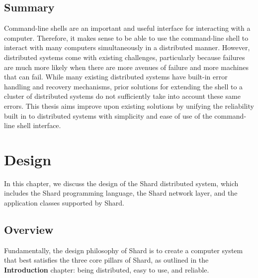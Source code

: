 \documentclass[twoside]{report}
\begin{document}
\section{Summary}
Command-line shells are an important and useful interface for interacting with a computer.
Therefore, it makes sense to be able to use the command-line shell to interact with many computers simultaneously in a distributed manner.
However, distributed systems come with existing challenges, particularly because failures are much more likely when there are more avenues of failure and more machines that can fail.
While many existing distributed systems have built-in error handling and recovery mechanisms, prior solutions for extending the shell to a cluster of distributed systems do not sufficiently take into account these same errors.
This thesis aims improve upon existing solutions by unifying the reliability built in to distributed systems with simplicity and ease of use of the command-line shell interface.

\chapter{Design}

In this chapter, we discuss the design of the Shard distributed system, which includes the Shard programming language, the Shard network layer, and the application classes supported by Shard.

\section{Overview}

Fundamentally, the design philosophy of Shard is to create a computer system that best satisfies the three core pillars of Shard, as outlined in the \textbf{Introduction} chapter: being distributed, easy to use, and reliable.
\end{document}
